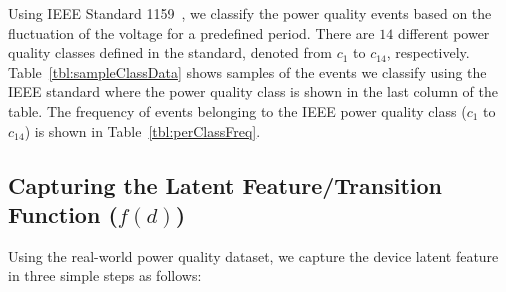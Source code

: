 Using IEEE Standard 1159~\cite{IEEE09_1159}, we classify the power quality events based on the fluctuation of the voltage for a predefined period. There are $14$ different power quality classes defined in the standard, denoted from $c_1$ to $c_{14}$, respectively. Table~\ref{tbl:sampleClassData} shows samples of the events we classify using the IEEE standard where the power quality class is shown in the last column of the table. The frequency of events belonging to the IEEE power quality class ($c_1$ to $c_{14}$) is shown in Table~\ref{tbl:perClassFreq}.

\subsection{Capturing the Latent Feature/Transition Function ($f(d)$)}
Using the real-world power quality dataset, we capture the device latent feature in three simple steps as follows:

